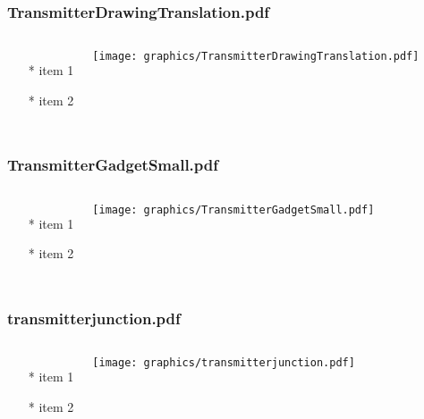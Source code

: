 \documentclass{beamer}
\begin{document}
\begin{frame} \frametitle{TransmitterDrawingTranslation.pdf}
    \begin{columns}[c]
        \begin{itemize}
            \item[*] item 1
            \item[*] item 2
        \end{itemize}
        \begin{minipage}{\linewidth}
            \begin{center}
            \texttt{[image: graphics/TransmitterDrawingTranslation.pdf]}
            \label{gfx:TransmitterDrawingTranslation.pdf}
            \end{center}
        \end{minipage}
    \end{columns}
\end{frame}
\begin{frame} \frametitle{TransmitterGadgetSmall.pdf}
    \begin{columns}[c]
        \begin{itemize}
            \item[*] item 1
            \item[*] item 2
        \end{itemize}
        \begin{minipage}{\linewidth}
            \begin{center}
            \texttt{[image: graphics/TransmitterGadgetSmall.pdf]}
            \label{gfx:TransmitterGadgetSmall.pdf}
            \end{center}
        \end{minipage}
    \end{columns}
\end{frame}
\begin{frame} \frametitle{transmitterjunction.pdf}
    \begin{columns}[c]
        \begin{itemize}
            \item[*] item 1
            \item[*] item 2
        \end{itemize}
        \begin{minipage}{\linewidth}
            \begin{center}
            \texttt{[image: graphics/transmitterjunction.pdf]}
            \label{gfx:transmitterjunction.pdf}
            \end{center}
        \end{minipage}
    \end{columns}
\end{frame}
\end{document}
